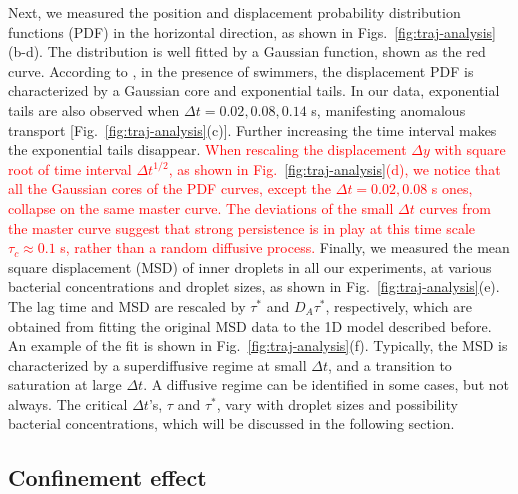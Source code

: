 \documentclass[%
10pt,
superscriptaddress,
twocolumn,
 amsmath,amssymb,
 aps,prx,
]{revtex4-2}
\begin{document}
Next, we measured the position and displacement probability distribution functions (PDF) in the horizontal direction, as shown in Figs.~\ref{fig:traj-analysis}(b-d).
The distribution is well fitted by a Gaussian function, shown as the red curve.
According to \citet{Leptos2009}, in the presence of swimmers, the displacement PDF is characterized by a Gaussian core and exponential tails.
In our data, exponential tails are also observed when $\Delta t = 0.02, 0.08, 0.14$ s, manifesting anomalous transport [Fig.~\ref{fig:traj-analysis}(c)].
Further increasing the time interval makes the exponential tails disappear.
\textcolor{red}{When rescaling the displacement $\Delta y$ with square root of time interval $\Delta t^{1/2}$, as shown in Fig.~\ref{fig:traj-analysis}(d), we notice that all the Gaussian cores of the PDF curves, except the $\Delta t=0.02, 0.08$ s ones, collapse on the same master curve.
The deviations of the small $\Delta t$ curves from the master curve suggest that strong persistence is in play at this time scale $\tau_c\approx 0.1$ s, rather than a random diffusive process.}
Finally, we measured the mean square displacement (MSD) of inner droplets in all our experiments, at various bacterial concentrations and droplet sizes, as shown in Fig.~\ref{fig:traj-analysis}(e).
The lag time and MSD are rescaled by $\tau^*$ and $D_A\tau^*$, respectively, which are obtained from fitting the original MSD data to the 1D model described before.
An example of the fit is shown in Fig.~\ref{fig:traj-analysis}(f).
Typically, the MSD is characterized by a superdiffusive regime at small $\Delta t$, and a transition to saturation at large $\Delta t$.
A diffusive regime can be identified in some cases, but not always.
The critical $\Delta t$'s, $\tau$ and $\tau^*$, vary with droplet sizes and possibility bacterial concentrations, which will be discussed in the following section.

\subsection{Confinement effect}
\end{document}
